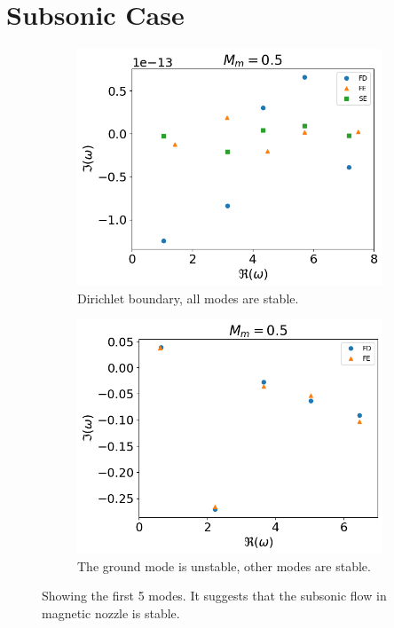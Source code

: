 \section{Subsonic Case}
\begin{figure} [H]
  \centering
  \begin{subfigure}{0.45\textwidth}
    \centering
    \includegraphics[width=\linewidth]{figures/numerical-experiments/fixed-fixed/subsonic-v}
    \caption{Dirichlet boundary, all modes are stable.}
  \end{subfigure}%
  \begin{subfigure}{0.45\textwidth}
    \includegraphics[width=\linewidth]{figures/numerical-experiments/fixed-open/subsonic-v}
    \caption{The ground mode is unstable, other modes are stable.}
  \end{subfigure}
  \caption{Showing the first 5 modes. It suggests that the subsonic flow in magnetic nozzle is stable.}
\end{figure}

